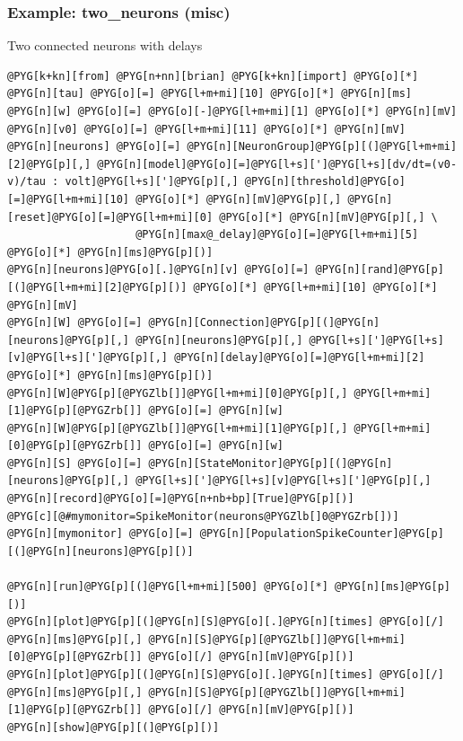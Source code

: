 \documentclass[letterpaper,10pt,english]{manual}
\begin{document}
\resetcurrentobjects
\hypertarget{--doc-examples-misc_two_neurons}{}

\hypertarget{index-72}{}\subsubsection{Example: two\_neurons (misc)}

Two connected neurons with delays

\begin{Verbatim}[commandchars=@\[\]]
@PYG[k+kn][from] @PYG[n+nn][brian] @PYG[k+kn][import] @PYG[o][*]
@PYG[n][tau] @PYG[o][=] @PYG[l+m+mi][10] @PYG[o][*] @PYG[n][ms]
@PYG[n][w] @PYG[o][=] @PYG[o][-]@PYG[l+m+mi][1] @PYG[o][*] @PYG[n][mV]
@PYG[n][v0] @PYG[o][=] @PYG[l+m+mi][11] @PYG[o][*] @PYG[n][mV]
@PYG[n][neurons] @PYG[o][=] @PYG[n][NeuronGroup]@PYG[p][(]@PYG[l+m+mi][2]@PYG[p][,] @PYG[n][model]@PYG[o][=]@PYG[l+s][']@PYG[l+s][dv/dt=(v0-v)/tau : volt]@PYG[l+s][']@PYG[p][,] @PYG[n][threshold]@PYG[o][=]@PYG[l+m+mi][10] @PYG[o][*] @PYG[n][mV]@PYG[p][,] @PYG[n][reset]@PYG[o][=]@PYG[l+m+mi][0] @PYG[o][*] @PYG[n][mV]@PYG[p][,] \
                    @PYG[n][max@_delay]@PYG[o][=]@PYG[l+m+mi][5] @PYG[o][*] @PYG[n][ms]@PYG[p][)]
@PYG[n][neurons]@PYG[o][.]@PYG[n][v] @PYG[o][=] @PYG[n][rand]@PYG[p][(]@PYG[l+m+mi][2]@PYG[p][)] @PYG[o][*] @PYG[l+m+mi][10] @PYG[o][*] @PYG[n][mV]
@PYG[n][W] @PYG[o][=] @PYG[n][Connection]@PYG[p][(]@PYG[n][neurons]@PYG[p][,] @PYG[n][neurons]@PYG[p][,] @PYG[l+s][']@PYG[l+s][v]@PYG[l+s][']@PYG[p][,] @PYG[n][delay]@PYG[o][=]@PYG[l+m+mi][2] @PYG[o][*] @PYG[n][ms]@PYG[p][)]
@PYG[n][W]@PYG[p][@PYGZlb[]]@PYG[l+m+mi][0]@PYG[p][,] @PYG[l+m+mi][1]@PYG[p][@PYGZrb[]] @PYG[o][=] @PYG[n][w]
@PYG[n][W]@PYG[p][@PYGZlb[]]@PYG[l+m+mi][1]@PYG[p][,] @PYG[l+m+mi][0]@PYG[p][@PYGZrb[]] @PYG[o][=] @PYG[n][w]
@PYG[n][S] @PYG[o][=] @PYG[n][StateMonitor]@PYG[p][(]@PYG[n][neurons]@PYG[p][,] @PYG[l+s][']@PYG[l+s][v]@PYG[l+s][']@PYG[p][,] @PYG[n][record]@PYG[o][=]@PYG[n+nb+bp][True]@PYG[p][)]
@PYG[c][@#mymonitor=SpikeMonitor(neurons@PYGZlb[]0@PYGZrb[])]
@PYG[n][mymonitor] @PYG[o][=] @PYG[n][PopulationSpikeCounter]@PYG[p][(]@PYG[n][neurons]@PYG[p][)]

@PYG[n][run]@PYG[p][(]@PYG[l+m+mi][500] @PYG[o][*] @PYG[n][ms]@PYG[p][)]
@PYG[n][plot]@PYG[p][(]@PYG[n][S]@PYG[o][.]@PYG[n][times] @PYG[o][/] @PYG[n][ms]@PYG[p][,] @PYG[n][S]@PYG[p][@PYGZlb[]]@PYG[l+m+mi][0]@PYG[p][@PYGZrb[]] @PYG[o][/] @PYG[n][mV]@PYG[p][)]
@PYG[n][plot]@PYG[p][(]@PYG[n][S]@PYG[o][.]@PYG[n][times] @PYG[o][/] @PYG[n][ms]@PYG[p][,] @PYG[n][S]@PYG[p][@PYGZlb[]]@PYG[l+m+mi][1]@PYG[p][@PYGZrb[]] @PYG[o][/] @PYG[n][mV]@PYG[p][)]
@PYG[n][show]@PYG[p][(]@PYG[p][)]
\end{Verbatim}
\end{document}
